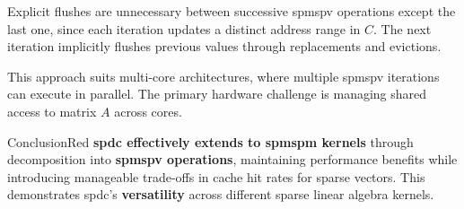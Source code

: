 Explicit flushes are unnecessary between successive \acrshort{spmspv} operations except the last one, since each iteration updates a distinct address range in $C$.
The next iteration implicitly flushes previous values through replacements and \glspl{eviction}.

This approach suits multi-core architectures, where multiple \acrshort{spmspv} iterations can execute in parallel.
The primary hardware challenge is managing shared access to matrix $A$ across cores.

\begin{highlight}{Conclusion}{Red}
    \textbf{\acrlong{spdc} effectively extends to \acrshort{spmspm} kernels} through decomposition into \textbf{\acrshort{spmspv} operations}, maintaining performance benefits while introducing manageable trade-offs in cache \gls{hit} rates for sparse vectors.
    This demonstrates \acrlong{spdc}'s \textbf{versatility} across different sparse linear algebra kernels.
\end{highlight}